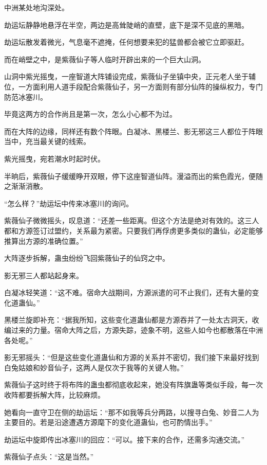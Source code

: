 
\begin{this_body}

中洲某处地沟深处。

劫运坛静静地悬浮在半空，两边是高耸陡峭的直壁，底下是深不见底的黑暗。

劫运坛散发着微光，气息毫不遮掩，任何想要来犯的猛兽都会被它立即驱赶。

而在峭壁之中，是紫薇仙子等人临时开辟出来的一个巨大山洞。

山洞中紫光摇曳，一座智道大阵铺设完成，紫薇仙子坐镇中央，正元老人坐于辅位，一方面利用人道手段配合紫薇仙子，另一方面则有部分仙阵的操纵权力，专门防范冰塞川。

毕竟这两方的合作尚且是第一次，怎么小心都不为过。

而在大阵的边缘，同样还有数个阵眼。白凝冰、黑楼兰、影无邪这三人都位于阵眼当中，充当最关键的线索。

紫光摇曳，宛若潮水时起时伏。

半晌后，紫薇仙子缓缓睁开双眼，停下这座智道仙阵。漫溢而出的紫色霞光，便随之渐渐消散。

“怎么样？”劫运坛中传来冰塞川的询问。

紫薇仙子微微摇头，叹息道：“还差一些距离。但这个方法是绝对有效的。这三人都和方源签订过盟约，关系最为紧密。只要我们再俘虏更多类似的蛊仙，必定能够推算出方源的准确位置。”

大阵逐步拆解，蛊虫纷纷飞回紫薇仙子的仙窍之中。

影无邪三人都站起身来。

白凝冰轻笑道：“这不难。宿命大战期间，方源派遣的可不止我们，还有大量的变化道蛊仙。”

黑楼兰旋即补充：“据我所知，这些变化道蛊仙都是方源吞并了一处太古洞天，收编过来的力量。宿命大阵之后，方源失踪，迹象不明，这些人如今也都散落在中洲各处呢。”

影无邪摇头：“但是这些变化道蛊仙和方源的关系并不密切，我们接下来最好找到白兔姑娘和妙音仙子，这两人是仅次于我等的关键人物。”

紫薇仙子这时终于将布阵的蛊虫都彻底收起来，她没有阵旗蛊等类似手段，每一次收阵都要拆解大阵，比较麻烦。

她看向一直守卫在侧的劫运坛：“那不如我等兵分两路，以搜寻白兔、妙音二人为主要目的。若是沿途遭遇方源麾下的变化道蛊仙，也可酌情出手。”

劫运坛中旋即传出冰塞川的回应：“可以。接下来的合作，还需多沟通交流。”

紫薇仙子点头：“这是当然。”


\end{this_body}
